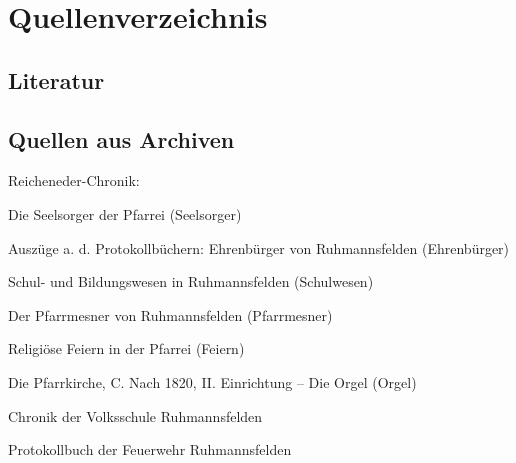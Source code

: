 \section{Quellenverzeichnis}

\subsection{Literatur}

\nocite{*}
\printbibliography[heading=none]

\subsection{Quellen aus Archiven}

\noindent Reicheneder-Chronik:

\begin{compactitem}
\item Die Seelsorger der Pfarrei (Seelsorger)
\item Auszüge a. d. Protokollbüchern: Ehrenbürger von Ruhmannsfelden
(Ehrenbürger)
\item Schul- und Bildungswesen in Ruhmannsfelden (Schulwesen)
\item Der Pfarrmesner von Ruhmannsfelden (Pfarrmesner)
\item Religiöse Feiern in der Pfarrei (Feiern)
\item Die Pfarrkirche, C. Nach 1820, II. Einrichtung – Die Orgel (Orgel)
\item Chronik der Volksschule Ruhmannsfelden
\item Protokollbuch der Feuerwehr Ruhmannsfelden
\end{compactitem}